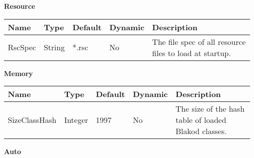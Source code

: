 \begin{center}
\textbf{Resource} \par

\begin{tabular}{|l|l|p{1.5in}|l|p{2.9in}|} \hline
Name & Type & Default & Dynamic & Description 
\\ \hline
RscSpec & String & *.rsc & No & The file spec of all resource files to load at startup.
\\ \hline 
\end{tabular}

\textbf{Memory} \par

\begin{tabular}{|l|l|p{1.5in}|l|p{2.6in}|} \hline
Name & Type & Default & Dynamic & Description 
\\ \hline
SizeClassHash & Integer & 1997 & No & The size of the hash table of loaded Blakod classes.
\\ \hline 
\end{tabular}

\textbf{Auto} \par


\end{center}

